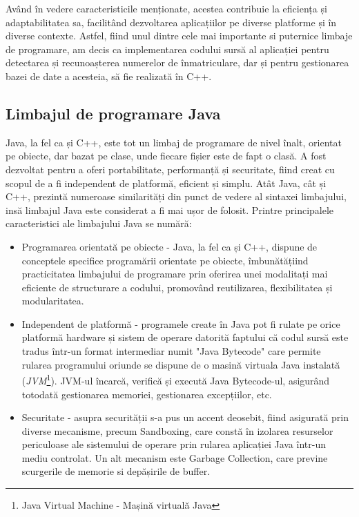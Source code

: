 \documentclass[12pt]{article}
\begin{document}
Av\^{a}nd \^{i}n vedere caracteristicile menționate, acestea contribuie la eficiența și adaptabilitatea sa, facilit\^{a}nd dezvoltarea aplicațiilor pe diverse platforme și \^{i}n diverse contexte. Astfel, fiind unul dintre cele mai importante si puternice limbaje de programare, am decis ca implementarea codului surs\u{a} al aplicației pentru detectarea și recunoașterea numerelor de \^{i}nmatriculare, dar și pentru gestionarea bazei de date a acesteia, s\u{a} fie realizat\u{a} \^{i}n C++.

\subsection{Limbajul de programare Java}

Java, la fel ca și C++, este tot un limbaj de programare de nivel \^{i}nalt, orientat pe obiecte, dar bazat pe clase, unde fiecare fișier este de fapt o clas\u{a}. A fost dezvoltat pentru a oferi portabilitate, performanț\u{a} și securitate, fiind creat cu scopul de a fi independent de platform\u{a}, eficient și simplu. At\^{a}t Java, c\^{a}t și C++, prezint\u{a} numeroase similarit\u{a}ți din punct de vedere al sintaxei limbajului, ins\u{a} limbajul Java este considerat a fi mai ușor de folosit. Printre principalele caracteristici ale limbajului Java se num\u{a}r\u{a}:

\begin{itemize}
    \item Programarea orientat\u{a} pe obiecte - Java, la fel ca și C++, dispune de conceptele specifice program\u{a}rii orientate pe obiecte, \^{i}mbun\u{a}t\u{a}țiind practicitatea limbajului de programare prin oferirea unei modalitați mai eficiente de structurare a codului, promov\^{a}nd reutilizarea, flexibilitatea și modularitatea.
    \item Independent de platform\u{a} - programele create \^{i}n Java pot fi rulate pe orice platform\u{a} hardware și sistem de operare datorit\u{a} faptului c\u{a} codul surs\u{a} este tradus \^{i}ntr-un format intermediar numit "Java Bytecode" care permite rularea programului oriunde se dispune de o masin\u{a} virtuala Java instalat\u{a} (\emph{JVM}\footnote{Java Virtual Machine - Mașin\u{a} virtual\u{a} Java}). JVM-ul \^{i}ncarc\u{a}, verific\u{a} și execut\u{a} Java Bytecode-ul, asigur\^{a}nd totodat\u{a} gestionarea memoriei, gestionarea excepțiilor, etc.
    \item Securitate - asupra securit\u{a}ții s-a pus un accent deosebit, fiind asigurat\u{a} prin diverse mecanisme, precum Sandboxing, care const\u{a} \^{i}n izolarea resurselor periculoase ale sistemului de operare prin rularea aplicației Java \^{i}ntr-un mediu controlat. Un alt mecanism este Garbage Collection, care previne scurgerile de memorie si dep\u{a}șirile de buffer.
\end{itemize}
\end{document}
